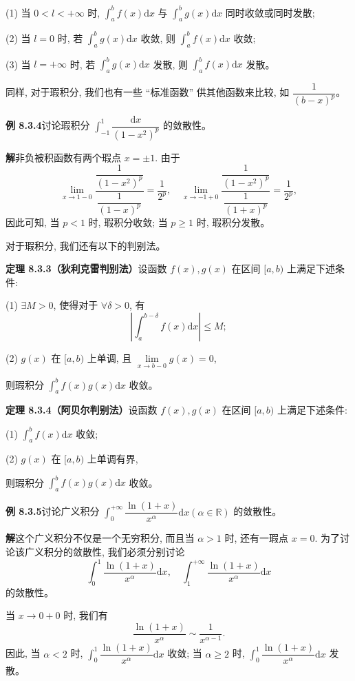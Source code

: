 \documentclass[UTF8,12pt,a4paper,fontset=fandol]{ctexart}
\begin{document}
(1) 当 $0<l<+\infty$ 时, $\int_a^b f(x)\mathrm dx$ 与 $\int_a^b g(x)\mathrm dx$ 同时收敛或同时发散;

(2) 当 $l=0$ 时, 若 $\int_a^b g(x)\mathrm dx$ 收敛, 则 $\int_a^b f(x)\mathrm dx$ 收敛;

(3) 当 $l=+\infty$ 时, 若 $\int_a^b g(x)\mathrm dx$ 发散, 则 $\int_a^b f(x)\mathrm dx$ 发散。

同样, 对于瑕积分, 我们也有一些 ``标准函数'' 供其他函数来比较, 如 $\dfrac1{(b-x)^p}$。

\noindent\textbf{例 8.3.4}\quad 讨论瑕积分 $\int_{-1}^1\dfrac{\mathrm dx}{(1-x^2)^p}$ 的敛散性。

\noindent\textbf{解}\quad 非负被积函数有两个瑕点 $x=\pm1$. 由于
\[
  \lim_{x\to1-0}
  \frac{\dfrac1{(1-x^2)^p}}{\dfrac1{(1-x)^p}}
  =
  \frac1{2^p},\quad
  \lim_{x\to-1+0}
  \frac{\dfrac1{(1-x^2)^p}}{\dfrac1{(1+x)^p}}
  =
  \frac1{2^p},
\]
因此可知, 当 $p<1$ 时, 瑕积分收敛; 当 $p\geq1$ 时, 瑕积分发散。

对于瑕积分, 我们还有以下的判别法。

\noindent\textbf{定理 8.3.3（狄利克雷判别法）}\quad 设函数 $f(x),g(x)$ 在区间 $[a,b)$ 上满足下述条件:

(1) $\exists M>0$, 使得对于 $\forall\delta>0$, 有
\[
  \left|\int_a^{b-\delta}f(x)\mathrm dx\right|\leq M;
\]

(2) $g(x)$ 在 $[a,b)$ 上单调, 且 $\lim\limits_{x\to b-0}g(x)=0$,

则瑕积分 $\int_a^b f(x)g(x)\mathrm dx$ 收敛。

\noindent\textbf{定理 8.3.4（阿贝尔判别法）}\quad 设函数 $f(x),g(x)$ 在区间 $[a,b)$ 上满足下述条件:

(1) $\int_a^b f(x)\mathrm dx$ 收敛;

(2) $g(x)$ 在 $[a,b)$ 上单调有界,

则瑕积分 $\int_a^b f(x)g(x)\mathrm dx$ 收敛。

\noindent\textbf{例 8.3.5}\quad 讨论广义积分 $\int_0^{+\infty}\dfrac{\ln(1+x)}{x^\alpha}\mathrm dx(\alpha\in\mathbb R)$ 的敛散性。

\noindent\textbf{解}\quad 这个广义积分不仅是一个无穷积分, 而且当 $\alpha>1$ 时, 还有一瑕点 $x=0$. 为了讨论该广义积分的敛散性, 我们必须分别讨论
\[
  \int_0^1\frac{\ln(1+x)}{x^\alpha}\mathrm dx,\quad
  \int_1^{+\infty}\frac{\ln(1+x)}{x^\alpha}\mathrm dx
\]
的敛散性。

当 $x\to0+0$ 时, 我们有
\[
  \frac{\ln(1+x)}{x^\alpha}\sim\frac1{x^{\alpha-1}}.
\]
因此, 当 $\alpha<2$ 时, $\int_0^1\dfrac{\ln(1+x)}{x^\alpha}\mathrm dx$ 收敛; 当 $\alpha\geq2$ 时, $\int_0^1\dfrac{\ln(1+x)}{x^\alpha}\mathrm dx$ 发散。
\end{document}
